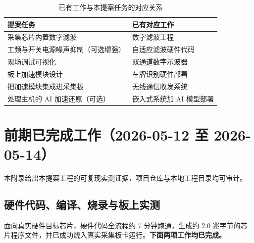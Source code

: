 \documentclass[a4paper,11pt,oneside,UTF8,scheme=plain]{ctexart}
\begin{document}
\begin{table}[H]
\centering
\caption{已有工作与本提案任务的对应关系}
\label{tab:capability-mapping}
\footnotesize
\begin{tabularx}{\textwidth}{>{\raggedright\arraybackslash}X>{\raggedright\arraybackslash}X}
\toprule
\rowcolor{tableheader}
\textbf{提案任务} & \textbf{已有对应工作} \\
\midrule
采集芯片内置数字滤波 & 数字滤波工程 \\
工频与开关电源噪声抑制（可选增强） & 自适应滤波硬件代码 \\
现场调试可视化 & 双通道数字示波器 \\
板上加速模块设计 & 车牌识别硬件部署 \\
把加速模块集成进采集板 & 无线通信收发系统 \\
处理主机的 AI 加速还原（可选） & 嵌入式系统加 AI 模型部署 \\
\bottomrule
\end{tabularx}
\end{table}

\section{前期已完成工作（2026-05-12 至 2026-05-14）}
\label{sec:appB}

本附录给出本提案工程的可复现实测证据，项目仓库与本地工程目录均可审计。

\subsection{硬件代码、编译、烧录与板上实测}
\label{sec:appB-vivado}

面向真实硬件目标芯片，硬件代码全流程约 7 分钟跑通，生成约 2.0 兆字节的芯片程序文件，并已成功烧入真实采集板卡运行。\textbf{下面两项工作均已完成。}
\end{document}
